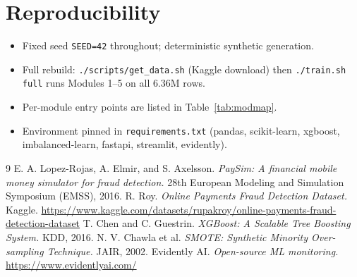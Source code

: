 \documentclass[11pt,a4paper]{report}
\newcommand{\code}[1]{\texttt{\small #1}}
\begin{document}
\section{Reproducibility}

\begin{itemize}[nosep,leftmargin=1.4em]
  \item Fixed seed \code{SEED=42} throughout; deterministic synthetic generation.
  \item Full rebuild: \code{./scripts/get\_data.sh} (Kaggle download) then
        \code{./train.sh full} runs Modules 1–5 on all 6.36M rows.
  \item Per-module entry points are listed in Table~\ref{tab:modmap}.
  \item Environment pinned in \code{requirements.txt} (pandas, scikit-learn, xgboost,
        imbalanced-learn, fastapi, streamlit, evidently).
\end{itemize}

\begin{thebibliography}{9}
 E. A. Lopez-Rojas, A. Elmir, and S. Axelsson.
\emph{PaySim: A financial mobile money simulator for fraud detection.}
28th European Modeling and Simulation Symposium (EMSS), 2016.
 R. Roy. \emph{Online Payments Fraud Detection Dataset.} Kaggle.
\url{https://www.kaggle.com/datasets/rupakroy/online-payments-fraud-detection-dataset}
 T. Chen and C. Guestrin. \emph{XGBoost: A Scalable Tree Boosting System.}
KDD, 2016.
 N. V. Chawla et al. \emph{SMOTE: Synthetic Minority Over-sampling
Technique.} JAIR, 2002.
 Evidently AI. \emph{Open-source ML monitoring.}
\url{https://www.evidentlyai.com/}
\end{thebibliography}
\end{document}
